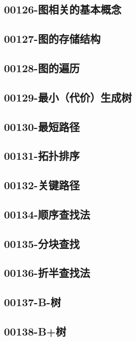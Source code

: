 \subsection{00126-图相关的基本概念}

\subsection{00127-图的存储结构}

\subsection{00128-图的遍历}

\subsection{00129-最小（代价）生成树}

\subsection{00130-最短路径}

\subsection{00131-拓扑排序}

\subsection{00132-关键路径}

\subsection{00134-顺序查找法}

\subsection{00135-分块查找}

\subsection{00136-折半查找法}

\subsection{00137-B-树}

\subsection{00138-B+树}

